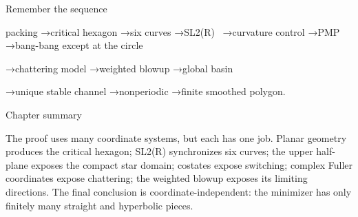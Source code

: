 Remember the sequence


\begin{displaytext}
packing →critical hexagon →six curves →SL2(R) \
→curvature control →PMP →bang-bang except at the circle
\end{displaytext}

\begin{displaytext}
→chattering model →weighted blowup →global basin
\end{displaytext}

\begin{displaytext}
→unique stable channel →nonperiodic →finite smoothed polygon.
\end{displaytext}

\begin{insightbox}{Chapter summary}
\end{insightbox}

The proof uses many coordinate systems, but each has one job. Planar geometry produces the critical hexagon; SL2(R) synchronizes six curves; the upper half-plane exposes the compact star domain; costates expose switching; complex Fuller coordinates expose chattering; the weighted blowup exposes its limiting directions. The final conclusion is coordinate-independent: the minimizer has only finitely many straight and hyperbolic pieces.


